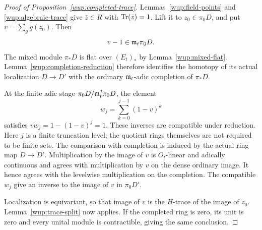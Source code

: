 \begin{proof}[Proof of Proposition~\ref{wup:completed-trace}]
Lemmas~\ref{wup:field-points} and \ref{wup:algebraic-trace}
give \(\bar z\in R\) with \(\operatorname{Tr}(\bar z)=1\). Lift it to
\(z_0\in\pi_0D\), and put \(v=\sum_g g(z_0)\). Then
\[
 v-1\in\mathfrak m_t\pi_0D.
\]
The mixed module \(\pi_*D\) is flat over \((E_t)_*\) by
Lemma~\ref{wup:mixed-flat}. Lemma~\ref{wup:completion-reduction}
therefore identifies the homotopy of its actual localization
\(D\to D'\) with the ordinary \(\mathfrak m_t\)-adic completion of
\(\pi_*D\).

At the finite adic stage \(\pi_0D/\mathfrak m_t^j\pi_0D\), the element
\[
 w_j=\sum_{k=0}^{j-1}(1-v)^k
\]
satisfies \(v w_j=1-(1-v)^j=1\). These inverses are compatible
under reduction. Here \(j\) is a finite truncation level; the
quotient rings themselves are not required to be finite sets.
The comparison with completion is induced by the actual ring map
\(D\to D'\). Multiplication by the image of \(v\) is
\(O_t\)-linear and adically continuous and agrees with
multiplication by \(v\) on the dense ordinary image. It hence
agrees with the levelwise multiplication on the completion.
The compatible \(w_j\) give an inverse to the image of \(v\) in
\(\pi_0D'\).

Localization is equivariant, so that image of \(v\) is the
\(H\)-trace of the image of \(z_0\). Lemma~\ref{wup:trace-split}
now applies. If the completed ring is zero, its unit is zero and
every unital module is contractible, giving the same conclusion.
\end{proof}
